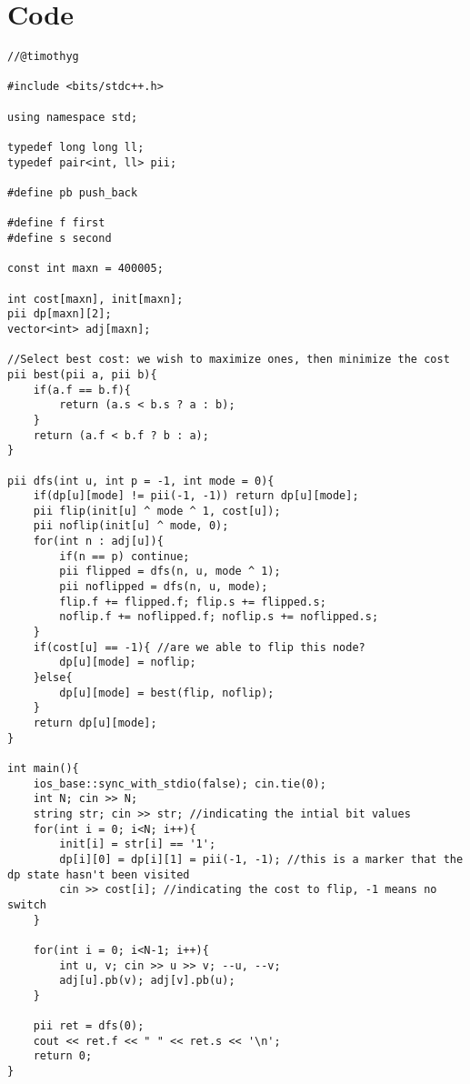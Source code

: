 \documentclass[15pt]{article}
\begin{document}
\section{Code}
\begin{lstlisting}
//@timothyg

#include <bits/stdc++.h>
 
using namespace std;
 
typedef long long ll;
typedef pair<int, ll> pii;

#define pb push_back

#define f first
#define s second

const int maxn = 400005;

int cost[maxn], init[maxn];
pii dp[maxn][2];
vector<int> adj[maxn];

//Select best cost: we wish to maximize ones, then minimize the cost
pii best(pii a, pii b){
    if(a.f == b.f){
        return (a.s < b.s ? a : b);
    }
    return (a.f < b.f ? b : a);
}

pii dfs(int u, int p = -1, int mode = 0){
    if(dp[u][mode] != pii(-1, -1)) return dp[u][mode];
    pii flip(init[u] ^ mode ^ 1, cost[u]);
    pii noflip(init[u] ^ mode, 0);
    for(int n : adj[u]){
        if(n == p) continue;
        pii flipped = dfs(n, u, mode ^ 1);
        pii noflipped = dfs(n, u, mode);
        flip.f += flipped.f; flip.s += flipped.s;
        noflip.f += noflipped.f; noflip.s += noflipped.s;
    }
    if(cost[u] == -1){ //are we able to flip this node?
        dp[u][mode] = noflip;
    }else{
        dp[u][mode] = best(flip, noflip);
    }
    return dp[u][mode];
}

int main(){
    ios_base::sync_with_stdio(false); cin.tie(0);
    int N; cin >> N;
    string str; cin >> str; //indicating the intial bit values
    for(int i = 0; i<N; i++){
        init[i] = str[i] == '1';
        dp[i][0] = dp[i][1] = pii(-1, -1); //this is a marker that the dp state hasn't been visited
        cin >> cost[i]; //indicating the cost to flip, -1 means no switch
    }

    for(int i = 0; i<N-1; i++){
        int u, v; cin >> u >> v; --u, --v;
        adj[u].pb(v); adj[v].pb(u);
    }

    pii ret = dfs(0);
    cout << ret.f << " " << ret.s << '\n';
    return 0;
}
\end{lstlisting}
\end{document}
